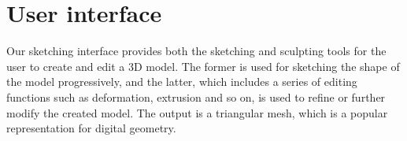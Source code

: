 %
%


\section{User interface}
\label{ch3:sec:ui}

Our sketching interface provides both the sketching and sculpting
tools for the user to create and edit a 3D model. The former is used
for sketching the shape of the model progressively, and the latter,
which includes a series of editing functions such as deformation,
extrusion and so on, is used to refine or further modify the created
model. The output is a triangular mesh, which is a popular
representation for digital geometry.

